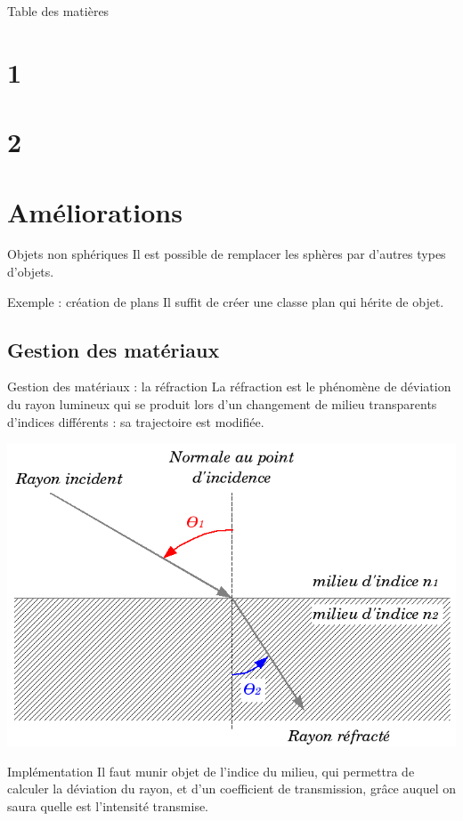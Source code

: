 \documentclass{beamer}
\begin{document}
\begin{frame}{Table des matières}
	\tableofcontents
\end{frame}

\section{1}

\section{2}

\section{Améliorations}

\begin{frame}{Objets non sphériques}
Il est possible de remplacer les sphères par d'autres types d'objets.

\begin{block}{Exemple : création de plans}
Il suffit de créer une classe plan qui hérite de objet.
\end{block}
\end{frame}

\subsection{Gestion des matériaux}
\begin{frame}{Gestion des matériaux : la réfraction}
La réfraction est le phénomène de déviation du rayon lumineux qui se produit
lors d'un changement de milieu transparents d'indices différents : sa
trajectoire est modifiée.

\begin{center}
  \includegraphics[scale=0.2]{img/Refraction_fr.png}
\end{center}

\begin{block}{Implémentation}
Il faut munir objet de l'indice du milieu, qui permettra de calculer la
déviation du rayon, et d'un coefficient de transmission, grâce auquel on saura
quelle est l'intensité transmise.
\end{block}
\end{frame}
\end{document}
